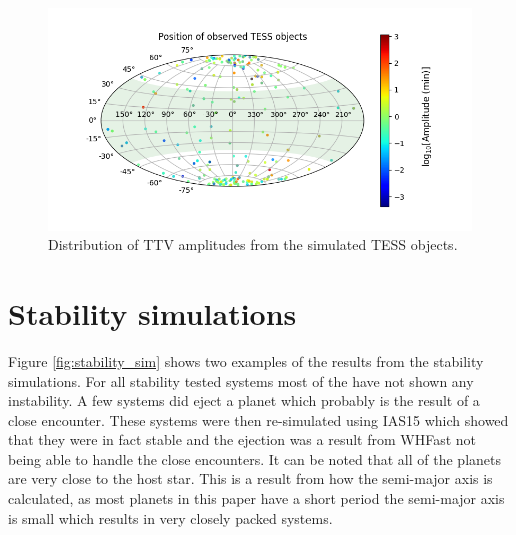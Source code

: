 \documentclass[12pt]{report}
\begin{document}
\begin{figure}[h!]
 	 \centering
	  \includegraphics[width=\textwidth]{img/skymap_TESS_amp.png}
	  \caption{Distribution of TTV amplitudes from the simulated TESS objects.}
	 \label{fig:skymap_amp}
\end{figure}
\section{Stability simulations}
	Figure \ref{fig:stability_sim} shows two examples of the results from the stability simulations. For all stability tested systems most of the have not shown any instability. A few systems did eject a planet which  probably is the result of a close encounter. These systems were then re-simulated using IAS15 which showed that they were in fact stable and the ejection was a result from WHFast not being able to handle the close encounters. It can be noted that all of the planets are very close to the host star. This is a result from how the semi-major axis is calculated, as most planets in this paper have a short period the semi-major axis is small which results in very closely packed systems.
\end{document}
